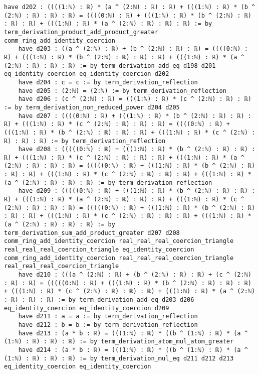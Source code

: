\documentclass{article}
\begin{document}
\begin{tcolorbox}[colback=white!10, width=\linewidth]
\begin{lstlisting}[language=Lean4]
    have d202 : ((((1:ℕ) : ℝ) * (a ^ (2:ℕ) : ℝ) : ℝ) + (((1:ℕ) : ℝ) * (b ^ (2:ℕ) : ℝ) : ℝ) : ℝ) = ((((0:ℕ) : ℝ) + (((1:ℕ) : ℝ) * (b ^ (2:ℕ) : ℝ) : ℝ) : ℝ) + (((1:ℕ) : ℝ) * (a ^ (2:ℕ) : ℝ) : ℝ) : ℝ) := by term_derivation_product_add_product_greater comm_ring_add_identity_coercion
    have d203 : ((a ^ (2:ℕ) : ℝ) + (b ^ (2:ℕ) : ℝ) : ℝ) = ((((0:ℕ) : ℝ) + (((1:ℕ) : ℝ) * (b ^ (2:ℕ) : ℝ) : ℝ) : ℝ) + (((1:ℕ) : ℝ) * (a ^ (2:ℕ) : ℝ) : ℝ) : ℝ) := by term_derivation_add_eq d198 d201 eq_identity_coercion eq_identity_coercion d202
    have d204 : c = c := by term_derivation_reflection
    have d205 : (2:ℕ) = (2:ℕ) := by term_derivation_reflection
    have d206 : (c ^ (2:ℕ) : ℝ) = (((1:ℕ) : ℝ) * (c ^ (2:ℕ) : ℝ) : ℝ) := by term_derivation_non_reduced_power d204 d205
    have d207 : ((((0:ℕ) : ℝ) + (((1:ℕ) : ℝ) * (b ^ (2:ℕ) : ℝ) : ℝ) : ℝ) + (((1:ℕ) : ℝ) * (c ^ (2:ℕ) : ℝ) : ℝ) : ℝ) = ((((0:ℕ) : ℝ) + (((1:ℕ) : ℝ) * (b ^ (2:ℕ) : ℝ) : ℝ) : ℝ) + (((1:ℕ) : ℝ) * (c ^ (2:ℕ) : ℝ) : ℝ) : ℝ) := by term_derivation_reflection
    have d208 : (((((0:ℕ) : ℝ) + (((1:ℕ) : ℝ) * (b ^ (2:ℕ) : ℝ) : ℝ) : ℝ) + (((1:ℕ) : ℝ) * (c ^ (2:ℕ) : ℝ) : ℝ) : ℝ) + (((1:ℕ) : ℝ) * (a ^ (2:ℕ) : ℝ) : ℝ) : ℝ) = (((((0:ℕ) : ℝ) + (((1:ℕ) : ℝ) * (b ^ (2:ℕ) : ℝ) : ℝ) : ℝ) + (((1:ℕ) : ℝ) * (c ^ (2:ℕ) : ℝ) : ℝ) : ℝ) + (((1:ℕ) : ℝ) * (a ^ (2:ℕ) : ℝ) : ℝ) : ℝ) := by term_derivation_reflection
    have d209 : (((((0:ℕ) : ℝ) + (((1:ℕ) : ℝ) * (b ^ (2:ℕ) : ℝ) : ℝ) : ℝ) + (((1:ℕ) : ℝ) * (a ^ (2:ℕ) : ℝ) : ℝ) : ℝ) + (((1:ℕ) : ℝ) * (c ^ (2:ℕ) : ℝ) : ℝ) : ℝ) = (((((0:ℕ) : ℝ) + (((1:ℕ) : ℝ) * (b ^ (2:ℕ) : ℝ) : ℝ) : ℝ) + (((1:ℕ) : ℝ) * (c ^ (2:ℕ) : ℝ) : ℝ) : ℝ) + (((1:ℕ) : ℝ) * (a ^ (2:ℕ) : ℝ) : ℝ) : ℝ) := by term_derivation_sum_add_product_greater d207 d208 comm_ring_add_identity_coercion real_real_real_coercion_triangle real_real_real_coercion_triangle eq_identity_coercion comm_ring_add_identity_coercion real_real_real_coercion_triangle real_real_real_coercion_triangle
    have d210 : (((a ^ (2:ℕ) : ℝ) + (b ^ (2:ℕ) : ℝ) : ℝ) + (c ^ (2:ℕ) : ℝ) : ℝ) = (((((0:ℕ) : ℝ) + (((1:ℕ) : ℝ) * (b ^ (2:ℕ) : ℝ) : ℝ) : ℝ) + (((1:ℕ) : ℝ) * (c ^ (2:ℕ) : ℝ) : ℝ) : ℝ) + (((1:ℕ) : ℝ) * (a ^ (2:ℕ) : ℝ) : ℝ) : ℝ) := by term_derivation_add_eq d203 d206 eq_identity_coercion eq_identity_coercion d209
    have d211 : a = a := by term_derivation_reflection
    have d212 : b = b := by term_derivation_reflection
    have d213 : (a * b : ℝ) = (((1:ℕ) : ℝ) * ((b ^ (1:ℕ) : ℝ) * (a ^ (1:ℕ) : ℝ) : ℝ) : ℝ) := by term_derivation_atom_mul_atom_greater
    have d214 : (a * b : ℝ) = (((1:ℕ) : ℝ) * ((b ^ (1:ℕ) : ℝ) * (a ^ (1:ℕ) : ℝ) : ℝ) : ℝ) := by term_derivation_mul_eq d211 d212 d213 eq_identity_coercion eq_identity_coercion

\end{lstlisting}
\end{tcolorbox}
\end{document}
